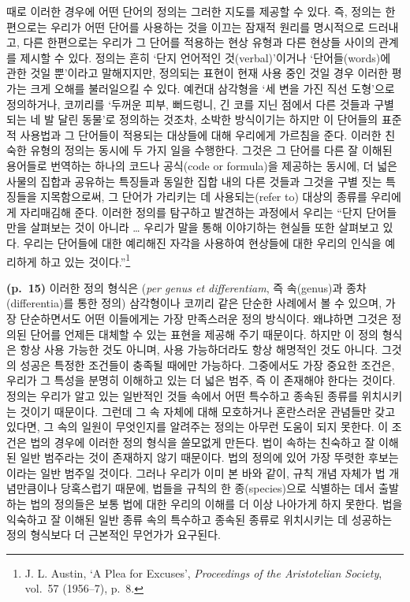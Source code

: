 때로 이러한 경우에 어떤 단어의 정의는 그러한 지도를 제공할 수 있다. 즉,
정의는 한편으로는 우리가 어떤 단어를 사용하는 것을 이끄는 잠재적 원리를
명시적으로 드러내고, 다른 한편으로는 우리가 그 단어를 적용하는 현상
유형과 다른 현상들 사이의 관계를 제시할 수 있다. 정의는 흔히 ‘단지
언어적인 것(verbal)’이거나 ‘단어들(words)에 관한 것일 뿐’이라고
말해지지만, 정의되는 표현이 현재 사용 중인 것일 경우 이러한 평가는 크게
오해를 불러일으킬 수 있다. 예컨대 삼각형을 ‘세 변을 가진 직선 도형’으로
정의하거나, 코끼리를 ‘두꺼운 피부, 뻐드렁니, 긴 코를 지닌 점에서 다른
것들과 구별되는 네 발 달린 동물’로 정의하는 것조차, 소박한 방식이기는
하지만 이 단어들의 표준적 사용법과 그 단어들이 적용되는 대상들에 대해
우리에게 가르침을 준다. 이러한 친숙한 유형의 정의는 동시에 두 가지 일을
수행한다. 그것은 그 단어를 다른 잘 이해된 용어들로 번역하는 하나의
코드나 공식(code or formula)을 제공하는 동시에, 더 넓은 사물의 집합과
공유하는 특징들과 동일한 집합 내의 다른 것들과 그것을 구별 짓는 특징들을
지목함으로써, 그 단어가 가리키는 데 사용되는(refer to) 대상의 종류를
우리에게 자리매김해 준다. 이러한 정의를 탐구하고 발견하는 과정에서
우리는 “단지 단어들만을 살펴보는 것이 아니라 \ldots{} 우리가 말을 통해
이야기하는 현실들 또한 살펴보고 있다. 우리는 단어들에 대한 예리해진
자각을 사용하여 현상들에 대한 우리의 인식을 예리하게 하고 있는
것이다.”\footnote{J. L. Austin, `A Plea for Excuses', \emph{Proceedings
  of the Aristotelian Society}, vol.~57 (1956--7), p.~8.}

\textbf{(p.~15)} 이러한 정의 형식은 (\emph{per genus et differentiam},
즉 속(genus)과 종차(differentia)를 통한 정의) 삼각형이나 코끼리 같은
단순한 사례에서 볼 수 있으며, 가장 단순하면서도 어떤 이들에게는 가장
만족스러운 정의 방식이다. 왜냐하면 그것은 정의된 단어를 언제든 대체할 수
있는 표현을 제공해 주기 때문이다. 하지만 이 정의 형식은 항상 사용 가능한
것도 아니며, 사용 가능하더라도 항상 해명적인 것도 아니다. 그것의 성공은
특정한 조건들이 충족될 때에만 가능하다. 그중에서도 가장 중요한 조건은,
우리가 그 특성을 분명히 이해하고 있는 더 넓은 범주, 즉
이 존재해야 한다는 것이다. 정의는 우리가 알고 있는
일반적인 것들 속에서 어떤 특수하고 종속된 종류를 위치시키는 것이기
때문이다. 그런데 그 속 자체에 대해 모호하거나 혼란스러운 관념들만 갖고
있다면, 그 속의 일원이 무엇인지를 알려주는 정의는 아무런 도움이 되지
못한다. 이 조건은 법의 경우에 이러한 정의 형식을 쓸모없게 만든다. 법이
속하는 친숙하고 잘 이해된 일반 범주라는 것이 존재하지 않기 때문이다.
법의 정의에 있어 가장 뚜렷한 후보는 이라는 일반 범주일 것이다. 그러나 우리가 이미 본 바와 같이,
규칙 개념 자체가 법 개념만큼이나 당혹스럽기 때문에, 법들을 규칙의 한
종(species)으로 식별하는 데서 출발하는 법의 정의들은 보통 법에 대한
우리의 이해를 더 이상 나아가게 하지 못한다. 법을 익숙하고 잘 이해된 일반
종류 속의 특수하고 종속된 종류로 위치시키는 데 성공하는 정의 형식보다 더
근본적인 무언가가 요구된다.


